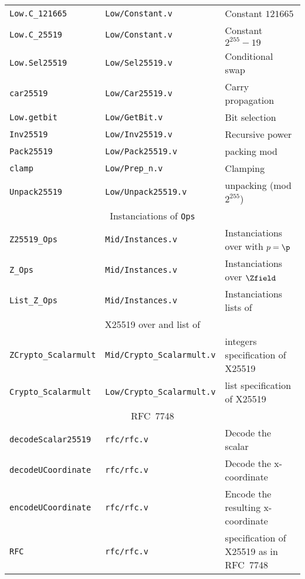 \begin{table*}[h]
\begin{tabular}{ l | l | l }
    \texttt{Low.C\_121665} & \texttt{Low/Constant.v} & Constant $121665$\\
    \texttt{Low.C\_25519} & \texttt{Low/Constant.v} & Constant $2^{255}-19$\\
    \texttt{Low.Sel25519} & \texttt{Low/Sel25519.v} & Conditional swap \\
    \texttt{car25519} & \texttt{Low/Car25519.v} & Carry propagation \\
    \texttt{Low.getbit} & \texttt{Low/GetBit.v} & Bit selection \\
    \texttt{Inv25519} & \texttt{Low/Inv25519.v} & Recursive power \\
    \texttt{Pack25519} & \texttt{Low/Pack25519.v} & packing mod \p\\
    \texttt{clamp} & \texttt{Low/Prep\_n.v} & Clamping \\
    \texttt{Unpack25519} & \texttt{Low/Unpack25519.v} & unpacking (mod $2^{255}$)\\
    \hline
    \multicolumn{3}{c}{Instanciations of \texttt{Ops}}\\
    \hline
    \texttt{Z25519\_Ops} & \texttt{Mid/Instances.v} & Instanciations over \F{p} with $p = \p$\\
    \texttt{Z\_Ops} & \texttt{Mid/Instances.v} & Instanciations over $\Zfield$ \\
    \texttt{List\_Z\_Ops} & \texttt{Mid/Instances.v} & Instanciations lists of \Z \\
    \hline
    \multicolumn{3}{c}{X25519 over \Z and list of \Z}\\
    \hline
    \texttt{ZCrypto\_Scalarmult} & \texttt{Mid/Crypto\_Scalarmult.v} & integers specification of X25519\\
    \texttt{Crypto\_Scalarmult} & \texttt{Low/Crypto\_Scalarmult.v} & list specification of X25519\\
    \hline
    \multicolumn{3}{c}{RFC~7748}\\
    \hline
    \texttt{decodeScalar25519} & \texttt{rfc/rfc.v} & Decode the scalar\\
    \texttt{decodeUCoordinate} & \texttt{rfc/rfc.v} & Decode the x-coordinate\\
    \texttt{encodeUCoordinate} & \texttt{rfc/rfc.v} & Encode the resulting x-coordinate\\
    \texttt{RFC} & \texttt{rfc/rfc.v} & specification of X25519 as in RFC~7748\\
    \hline
\end{tabular}
\end{table*}

